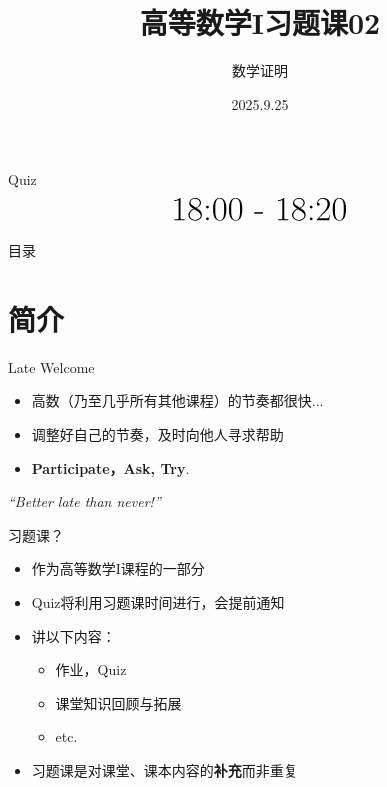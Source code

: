 \documentclass[]{beamer}
\title{高等数学I\quad 习题课02}
\subtitle{数学证明}
\date[2025.9.25]{2025.9.25}
\author[上海科技大学]{}
\institute[]{上海科技大学}
\begin{document}
\begin{frame}
    \vspace{15pt}
    \titlepage
\end{frame}

\begin{frame}{Quiz}
    \[
    \text{\Huge 18:00 - 18:20}
    \]
\end{frame}

\begin{frame}{目录}
    \tableofcontents
\end{frame}


\section{简介}

\begin{frame}{Late Welcome}
    \begin{itemize}
        \item 高数（乃至几乎所有其他课程）的节奏都很快...
        \item 调整好自己的节奏，及时向他人寻求帮助
        \item \textbf{Participate，Ask, Try}.
    \end{itemize}

    \vspace{0.5cm}
    \centering
    \textit{“Better late than never!”}
\end{frame}

\begin{frame}{习题课？}
    \begin{itemize}
        \item 作为高等数学I课程的一部分
        \item Quiz将利用习题课时间进行，会提前通知
        \item 讲以下内容：
        \begin{itemize}
            \item 作业，Quiz
            \item 课堂知识回顾与拓展
            \item etc.
        \end{itemize}
        \item 习题课是对课堂、课本内容的\textbf{补充}而非重复
    \end{itemize}
\end{frame}
\end{document}
